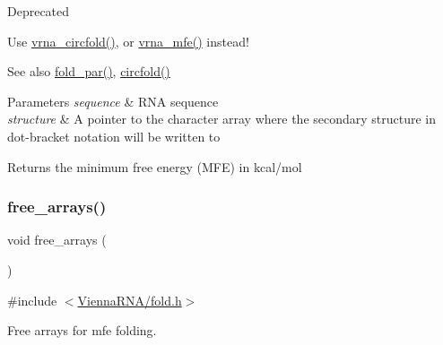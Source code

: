 \begin{DoxyRefDesc}{Deprecated}
\item[\mbox{\hyperlink{deprecated__deprecated000072}{Deprecated}}]Use \mbox{\hyperlink{group__mfe__fold__single_gaf973483d8acbc8cc9aacfc8a9b7f0074}{vrna\+\_\+circfold()}}, or \mbox{\hyperlink{group__mfe__fold_gabd3b147371ccf25c577f88bbbaf159fd}{vrna\+\_\+mfe()}} instead!\end{DoxyRefDesc}


\begin{DoxySeeAlso}{See also}
\mbox{\hyperlink{group__mfe__fold__single_ga2bc41df5d71fee6fd8da9904ee65d8fb}{fold\+\_\+par()}}, \mbox{\hyperlink{group__mfe__fold__single_ga4ac63ab3e8d9a80ced28b8052d94e423}{circfold()}}
\end{DoxySeeAlso}

\begin{DoxyParams}{Parameters}
{\em sequence} & R\+NA sequence \\
\hline
{\em structure} & A pointer to the character array where the secondary structure in dot-\/bracket notation will be written to \\
\hline
\end{DoxyParams}
\begin{DoxyReturn}{Returns}
the minimum free energy (M\+FE) in kcal/mol 
\end{DoxyReturn}
\mbox{\label{group__mfe__fold__single_ga107fdfe5fd641868156bfd849f6866c7}} 
\subsubsection{\texorpdfstring{free\+\_\+arrays()}{free\_arrays()}}
{\footnotesize\ttfamily void free\+\_\+arrays (\begin{DoxyParamCaption}\item[{void}]{ }\end{DoxyParamCaption})}



{\ttfamily \#include $<$\mbox{\hyperlink{fold_8h}{Vienna\+R\+N\+A/fold.\+h}}$>$}



Free arrays for mfe folding. 

